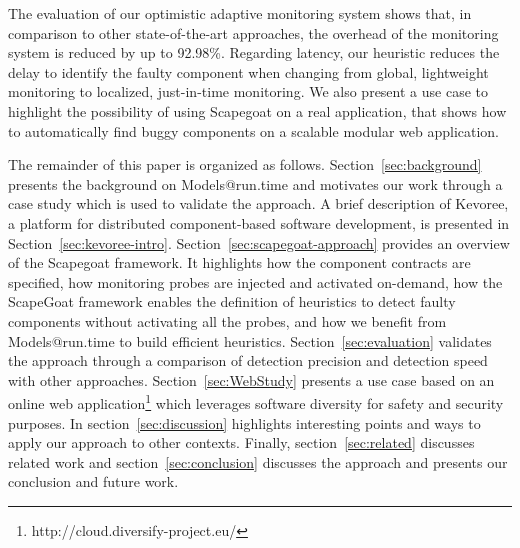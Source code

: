 The evaluation of our optimistic adaptive monitoring system shows that, in comparison to other state-of-the-art approaches, the overhead of the monitoring system is reduced by up to 92.98\%.
Regarding latency, our heuristic reduces the delay to identify the faulty component when changing from global, lightweight monitoring to localized, just-in-time monitoring.
We also present a use case to highlight the possibility of using Scapegoat on a real application, that shows how to automatically find buggy components on a scalable modular web application.

The remainder of this paper is organized as follows.
Section~\ref{sec:background} presents the background on Models@run.time and motivates our work through a case study which is used to validate the approach.
A brief description of Kevoree, a platform for distributed component-based software development, is presented in Section~\ref{sec:kevoree-intro}.
Section~\ref{sec:scapegoat-approach} provides an overview of the Scapegoat framework.
It highlights how the component contracts are specified, how monitoring probes are injected and activated on-demand, how the ScapeGoat framework enables the definition of heuristics to detect faulty components without activating all the probes, and how we benefit from Models@run.time to build efficient heuristics.
Section~\ref{sec:evaluation} validates the approach through a comparison of detection precision and detection speed with other approaches.
Section~\ref{sec:WebStudy} presents a use case based on an online web application\footnote{http://cloud.diversify-project.eu/} which leverages software diversity for safety and security purposes.
In section~\ref{sec:discussion} highlights interesting points and ways to apply our approach to other contexts.
Finally, section~\ref{sec:related} discusses related work and section~\ref{sec:conclusion} discusses the approach and presents our conclusion and future work.






